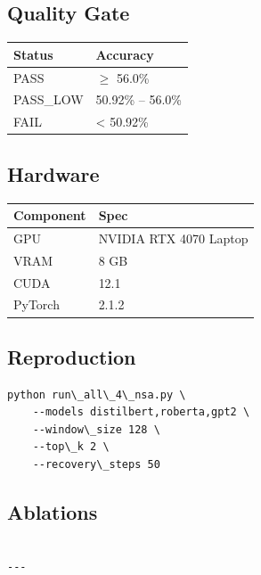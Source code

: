 \subsection{Quality Gate}

\begin{table}[H]
\centering
\small
\begin{tabular}{ll}
\toprule
\textbf{Status} & \textbf{Accuracy} \\
\midrule
PASS & $\ge$ 56.0\% \\
PASS\_LOW & 50.92\% -- 56.0\% \\
FAIL & \textless{} 50.92\% \\
\bottomrule
\end{tabular}
\end{table}

\subsection{Hardware}

\begin{table}[H]
\centering
\small
\begin{tabular}{ll}
\toprule
\textbf{Component} & \textbf{Spec} \\
\midrule
GPU & NVIDIA RTX 4070 Laptop \\
VRAM & 8 GB \\
CUDA & 12.1 \\
PyTorch & 2.1.2 \\
\bottomrule
\end{tabular}
\end{table}

\subsection{Reproduction}

\begin{lstlisting}
python run\_all\_4\_nsa.py \
    --models distilbert,roberta,gpt2 \
    --window\_size 128 \
    --top\_k 2 \
    --recovery\_steps 50
\end{lstlisting}

\subsection{Ablations}

\begin{lstlisting}

---
\end{lstlisting}